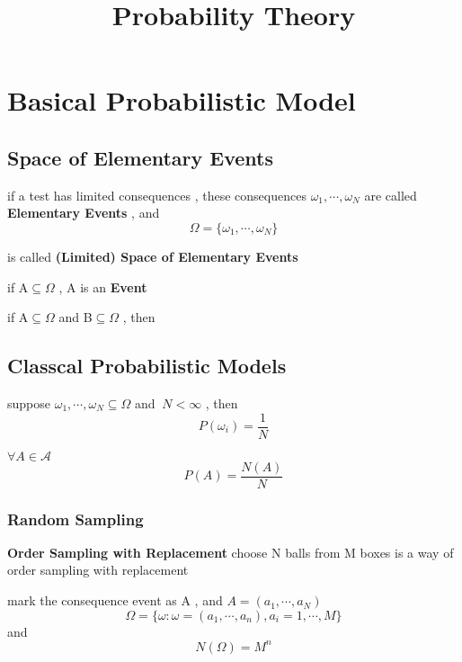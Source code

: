 \documentclass{ctexart}
\date{}
\title{Probability Theory}
\begin{document}
\maketitle
\tableofcontents
\newpage

\section {Basical Probabilistic Model}
\vspace{12 pt}

\subsection{Space of Elementary Events}

if a test has limited consequences , these consequences \(\omega_1,\cdots,\omega_N\) are called \textbf{Elementary Events} , and
\[\Omega = \{ \omega_1 , \cdots , \omega_N \}\]

\noindent is called \textbf{(Limited) Space of Elementary Events}

\vspace{ 12 pt}
if A\(\subseteq\)\(\Omega\) , A is an \textbf{Event} 

if A\(\subseteq \Omega\) and B\(\subseteq \Omega\) , then 


\vspace{12 pt}


\subsection{Classcal Probabilistic Models}
suppose \(\omega_1 ,\cdots  , \omega_N \subseteq \Omega \) and \(\ N  <\infty \) , then 
\[P(\omega_i)=\frac{1}{N}\]

 \(\forall A \in \mathscr{A}\)
\[P(A)=\frac{N(A)}{N}\]
\vspace{12 pt}

\subsubsection{Random Sampling}
\textbf{Order Sampling with Replacement}
choose N balls from M boxes is a way of order sampling with replacement

mark the consequence event as A , and \(A =(a_1 ,\cdots ,a_N)\) 
\[\Omega = \{\omega : \omega =(a_1,\cdots ,a_n),a_i=1,\cdots ,M \}\]
and 
\[N(\Omega)=M^n\]
\end{document}
